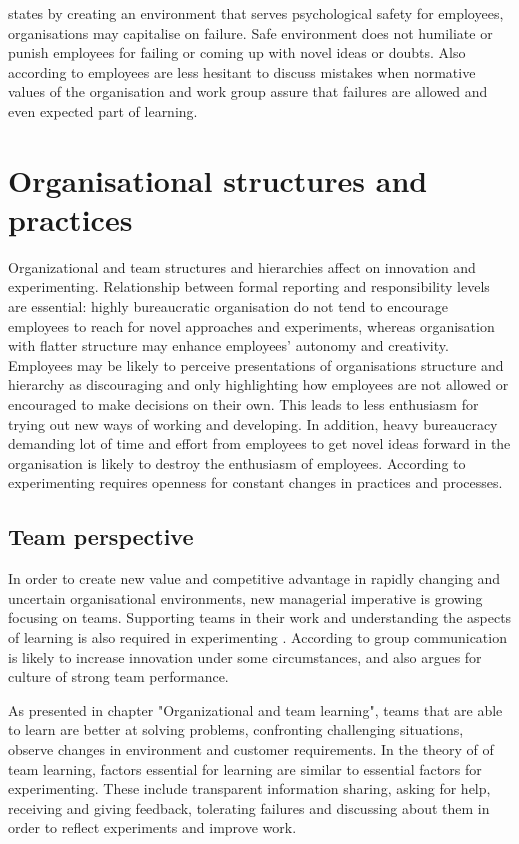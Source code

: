 \citet{garvin2008yours} states by creating an environment that serves psychological safety for employees, organisations may capitalise on failure. Safe environment does not humiliate or punish employees for failing or coming up with novel ideas or doubts. \citet{garvin2008yours} Also according to \citet{edmondson1996learning} employees are less hesitant to discuss mistakes when normative values of the organisation and work group assure that failures are allowed and even expected part of learning. 

\section{Organisational structures and practices}
Organizational and team structures and hierarchies affect on innovation and experimenting. Relationship between formal reporting and responsibility levels are essential: highly bureaucratic organisation do not tend to encourage employees to reach for novel approaches and experiments, whereas organisation with flatter structure may enhance employees' autonomy and creativity. Employees may be likely to perceive presentations of organisations structure and hierarchy as discouraging and only highlighting how employees are not allowed or encouraged to make decisions on their own. This leads to less enthusiasm for trying out new ways of working and developing. In addition, heavy bureaucracy demanding lot of time and effort from employees to get novel ideas forward in the organisation is likely to destroy the enthusiasm of employees. \citep{shalley2004leaders} According to \citet{thomke2003r} experimenting requires openness for constant changes in practices and processes.

\subsection{Team perspective}
In order to create new value and competitive advantage in rapidly changing and uncertain organisational environments, new managerial imperative is growing focusing on teams. Supporting teams in their work and understanding the aspects of learning is also required in experimenting \citep{edmondson1999psychological}. According to \citet{monge1992communication} group communication is likely to increase innovation under some circumstances, and also \citet{katzenbach1993wisdom} argues for culture of strong team performance.

As presented in chapter "Organizational and team learning", teams that are able to learn are better at solving problems, confronting challenging situations, observe changes in environment and customer requirements. In the theory of\citet{edmondson1999psychological} of team learning, factors essential for learning are similar to essential factors for experimenting. These include transparent information sharing, asking for help, receiving and giving feedback, tolerating failures and discussing about them in order to reflect experiments and improve work. \citep{edmondson1999psychological}

